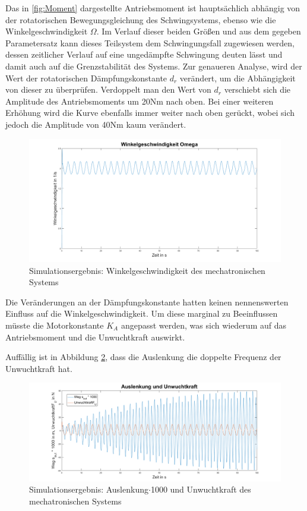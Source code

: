 Das in \ref{fig:Moment} dargestellte Antriebsmoment ist hauptsächlich abhängig von der rotatorischen Bewegungsgleichung des Schwingsystems, ebenso wie die Winkelgeschwindigkeit $\Omega$. Im Verlauf dieser beiden Größen und aus dem gegeben Parametersatz kann dieses Teilsystem dem Schwingungsfall zugewiesen werden, dessen zeitlicher Verlauf auf eine ungedämpfte Schwingung deuten lässt und damit auch auf die Grenzstabilität des Systems. Zur genaueren Analyse, wird der Wert der rotatorischen Dämpfungskonstante $d_r$ verändert, um die Abhängigkeit von dieser zu überprüfen. 
Verdoppelt man den Wert von $d_r$ verschiebt sich die Amplitude des Antriebsmoments um 20Nm nach oben. Bei einer weiteren Erhöhung wird die Kurve ebenfalls immer weiter nach oben gerückt, wobei sich jedoch die Amplitude von 40Nm kaum verändert. 

\begin{figure}[hbt]
	\centering
	\includegraphics[width=1\linewidth]{Images/Omega}
	\caption{Simulationsergebnis: Winkelgeschwindigkeit des mechatronischen Systems}
	\label{fig:Omega}
\end{figure}

Die Veränderungen an der Dämpfungskonstante hatten keinen nennenswerten Einfluss auf die Winkelgeschwindigkeit. Um diese marginal zu Beeinflussen müsste die Motorkonstante $K_A$ angepasst werden, was sich wiederum auf das Antriebsmoment und die Unwuchtkraft auswirkt.

Auffällig ist in Abbildung \ref{fig:StreckeundUnwuchtkraft}, dass die Auslenkung die doppelte Frequenz der Unwuchtkraft hat.

\begin{figure}[hbt]
	\centering
	\includegraphics[width=1\linewidth]{Images/StreckeundUnwuchtkraft}
	\caption{Simulationsergebnis: Auslenkung$\cdot$1000 und Unwuchtkraft des mechatronischen Systems}
	\label{fig:StreckeundUnwuchtkraft}
\end{figure}



